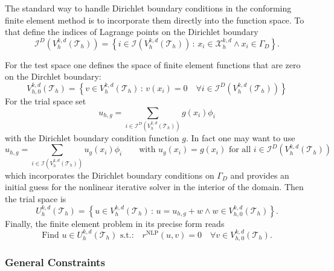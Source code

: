 \documentclass[a4paper,12pt]{article}
\begin{document}
The standard way to handle Dirichlet boundary conditions in the conforming
finite element method is to incorporate them directly into the function space.
To that define the indices of Lagrange points on the Dirichlet boundary
\begin{equation*}
\mathcal{I}^D\left(V_h^{k,d}(\mathcal{T}_h)\right) =
\left\{ i\in\mathcal{I}\left(V_h^{k,d}(\mathcal{T}_h)\right)  \,:\,
x_i\in\mathcal{X}_h^{k,d} \wedge x_i\in\Gamma_D
\right\} .
\end{equation*}

For the test space one defines the space of finite element
functions that are zero on the Dirchlet boundary:
\begin{equation*}
V_{h,0}^{k,d}(\mathcal{T}_{h}) = \left\{
v\in V_{h}^{k,d}(\mathcal{T}_{h}) \,:\, v(x_i) = 0
\quad \forall i\in\mathcal{I}^D\left(V_h^{k,d}(\mathcal{T}_h)\right)
 \right\}
\end{equation*}
For the trial space set
\begin{equation*}
u_{h,g} = \sum_{i\in \mathcal{I}^D\left(V_h^{k,d}(\mathcal{T}_h)\right)}
g(x_i) \phi_i
\end{equation*}
with the Dirichlet boundary condition function $g$. In fact one may want to
use
\begin{equation*}
u_{h,g} = \sum_{i\in \mathcal{I}\left(V_h^{k,d}(\mathcal{T}_h)\right)}
u_g(x_i) \phi_i \qquad \text{with $u_g(x_i)=g(x_i)$ for all $i\in
\mathcal{I}^D\left(V_h^{k,d}(\mathcal{T}_h)\right)$}
\end{equation*}
which incorporates the Dirichlet boundary conditions on $\Gamma_D$
and provides an initial guess for the nonlinear iterative solver in the
interior of the domain. Then the trial space is
\begin{equation*}
U_{h}^{k,d}(\mathcal{T}_{h}) = \left\{ u\in V_h^{k,d}(\mathcal{T}_h)
\,:\, u = u_{h,g} + w \wedge w\in V_{h,0}^{k,d}(\mathcal{T}_{h})\right\} .
\end{equation*}
Finally, the finite element problem in its precise form reads
\begin{equation}
\text{Find $u\in U_{h}^{k,d}(\mathcal{T}_{h})$ s.t.:}
\quad r^{\text{NLP}}(u,v)=0 \quad \forall v\in V_{h,0}^{k,d}(\mathcal{T}_{h}) .
\label{eq:PreciseFEProblem}
\end{equation}

\subsubsection*{General Constraints}
\end{document}
